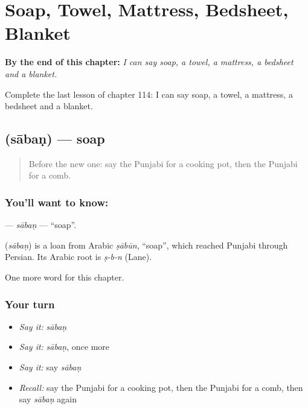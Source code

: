 
\chapter{Soap, Towel, Mattress, Bedsheet, Blanket}
\label{ch:pa-soap-towel-mattress-bedsheet-blanket}

\begin{chapteropening}
\textbf{By the end of this chapter:} \emph{I can say soap, a towel, a mattress, a bedsheet and a blanket.}

Complete the last lesson of chapter 114: I can say soap, a towel, a mattress, a bedsheet and a blanket.
\end{chapteropening}

\section[\texorpdfstring{\pa{ਸਾਬਣ} (sābaṇ)}{ਸਾਬਣ (sābaṇ)}]{ (sābaṇ) — soap}

\label{lesson:PA-C114-saban}



\begin{quote}
Before the new one: say the Punjabi for a cooking pot, then the Punjabi for a comb.
\end{quote}

\subsection*{You'll want to know: }
\textbf{} — \emph{sābaṇ} — \textquotedblleft{}soap\textquotedblright{}.

\begin{cousinweb}
\textbf{} (\emph{sābaṇ}) is a loan from Arabic \emph{ṣābūn}, \textquotedblleft{}soap\textquotedblright{}, which reached Punjabi through Persian. Its Arabic root is \emph{ṣ-b-n} (Lane).
\end{cousinweb}

\begin{grammarlens}[title={What you've built}]
One more word for this chapter.
\end{grammarlens}

\subsection*{Your turn}
\begin{itemize}
\raggedright
  \item \emph{Say it:} \emph{sābaṇ}
  \item \emph{Say it:} \emph{sābaṇ}, once more
  \item \emph{Say it:} say \emph{sābaṇ}
  \item \emph{Recall:} say the Punjabi for a cooking pot, then the Punjabi for a comb, then say \emph{sābaṇ} again
\end{itemize}

